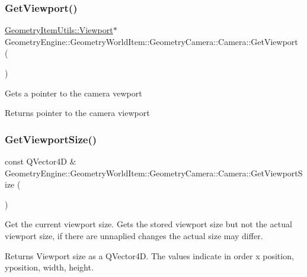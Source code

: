 \subsubsection{\texorpdfstring{GetViewport()}{GetViewport()}}
{\footnotesize\ttfamily \mbox{\hyperlink{class_geometry_engine_1_1_geometry_item_utils_1_1_viewport}{Geometry\+Item\+Utils\+::\+Viewport}}$\ast$ Geometry\+Engine\+::\+Geometry\+World\+Item\+::\+Geometry\+Camera\+::\+Camera\+::\+Get\+Viewport (\begin{DoxyParamCaption}{ }\end{DoxyParamCaption})\hspace{0.3cm}{\ttfamily [inline]}}

Gets a pointer to the camera vewport \begin{DoxyReturn}{Returns}
pointer to the camera viewport 
\end{DoxyReturn}
\mbox{\label{class_geometry_engine_1_1_geometry_world_item_1_1_geometry_camera_1_1_camera_a633facf8168c7bc943e256732cfb78dc}} 
\subsubsection{\texorpdfstring{GetViewportSize()}{GetViewportSize()}}
{\footnotesize\ttfamily const Q\+Vector4D \& Geometry\+Engine\+::\+Geometry\+World\+Item\+::\+Geometry\+Camera\+::\+Camera\+::\+Get\+Viewport\+Size (\begin{DoxyParamCaption}{ }\end{DoxyParamCaption})\hspace{0.3cm}{\ttfamily [virtual]}}

Get the current viewport size. Gets the stored viewport size but not the actual viewport size, if there are unnaplied changes the actual size may differ. \begin{DoxyReturn}{Returns}
Viewport size as a Q\+Vector4D. The values indicate in order x position, yposition, width, height. 
\end{DoxyReturn}
\mbox{\label{class_geometry_engine_1_1_geometry_world_item_1_1_geometry_camera_1_1_camera_a22afa49db8d7aa71d24b9fed728ab381}} 
